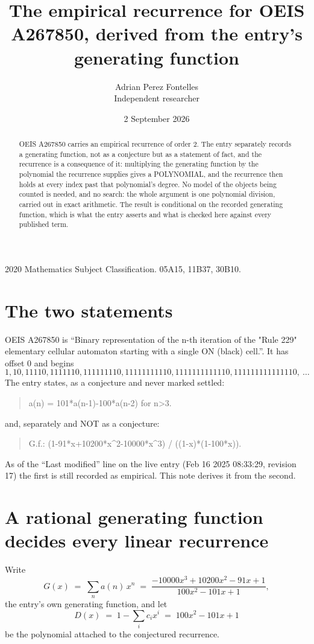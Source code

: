 \documentclass[11pt,a4paper]{article}
\title{The empirical recurrence for OEIS A267850, derived from the entry's generating function}
\author{Adrian Perez Fontelles\\ \small Independent researcher}
\date{2 September 2026}
\theoremstyle{plain}
\theoremstyle{definition}
\begin{document}
\maketitle

\begin{abstract}
OEIS A267850 carries an empirical recurrence of order $2$. The entry separately records a
generating function, not as a conjecture but as a statement of fact, and the recurrence is a
consequence of it: multiplying the generating function by the polynomial the recurrence
supplies gives a POLYNOMIAL, and the recurrence then holds at every index past that
polynomial's degree. No model of the objects being counted is needed, and no search: the
whole argument is one polynomial division, carried out in exact arithmetic. The result is
conditional on the recorded generating function, which is what the entry asserts and what is
checked here against every published term.
\end{abstract}

\noindent\small 2020 Mathematics Subject Classification. 05A15, 11B37, 30B10.\normalsize

\section{The two statements}

OEIS A267850 is ``Binary representation of the n-th iteration of the "Rule 229" elementary cellular automaton starting with a single ON (black) cell.''. It has offset $0$ and begins
\[
1, 10, 11110, 1111110, 111111110, 11111111110, 1111111111110, 111111111111110,\ \dots
\]
The entry states, as a conjecture and never marked settled:
\begin{quote}
a(n) = 101*a(n-1)-100*a(n-2) for n>3.
\end{quote}
and, separately and NOT as a conjecture:
\begin{quote}
G.f.: (1-91*x+10200*x\^{}2-10000*x\^{}3) / ((1-x)*(1-100*x)).
\end{quote}
As of the ``Last modified'' line on the live entry (Feb 16 2025 08:33:29, revision 17) the first is still
recorded as empirical. This note derives it from the second.

\section{A rational generating function decides every linear recurrence}

Write
\[
G(x)\;=\;\sum_{n}a(n)\,x^{n}\;=\;\frac{- 10000 x^{3} + 10200 x^{2} - 91 x + 1}{100 x^{2} - 101 x + 1},
\]
the entry's own generating function, and let
\[
D(x)\;=\;1-\sum_i c_i x^{i}\;=\;100 x^{2} - 101 x + 1
\]
be the polynomial attached to the conjectured recurrence.
\end{document}
